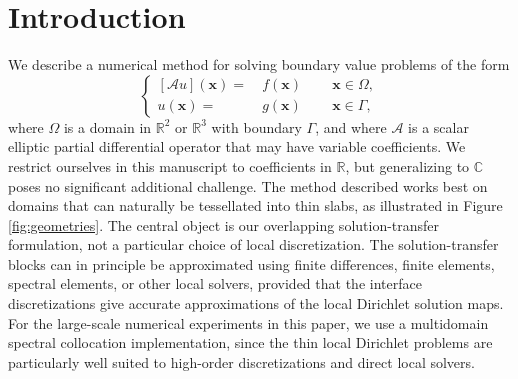 \documentclass[final,onefignum,onetabnum]{siamart250211}
\newcommand{\pvct}[1]{\bm{#1}}
\theoremstyle{definition}
\newcommand{\pgmnote}[1]{\textit{\color{blue}[#1]}}
\newcommand{\pxx}{\pvct{x}}
\begin{document}
\vspace{10mm}


\section{Introduction}
We describe a numerical method for solving boundary value problems of the form
\begin{equation}
\label{eq:basic}
\left\{\begin{aligned}\mbox{}
[\mathcal{A}u](\pxx) =&\ f(\pxx)\,\qquad \pxx \in \Omega,\\
   u(\pxx) =&\ g(\pxx)\,\qquad \pxx \in \Gamma,
\end{aligned}\right.
\end{equation}
where $\Omega$ is a domain in $\mathbb{R}^{2}$ or $\mathbb{R}^{3}$
with boundary $\Gamma$, and where $\mathcal{A}$ is a scalar elliptic
partial differential operator that may have variable coefficients. We restrict ourselves in this manuscript to coefficients in $\mathbb{R}$, but generalizing to $\mathbb{C}$ poses no significant additional challenge.
The method described works best on domains that can naturally be tessellated into thin slabs, as illustrated in Figure \ref{fig:geometries}. The central object is our overlapping solution-transfer formulation, not a particular choice of local discretization. The solution-transfer blocks can in principle be approximated using finite differences, finite elements, spectral elements, or other local solvers, provided that the interface discretizations give accurate approximations of the local Dirichlet solution maps. For the large-scale numerical experiments in this paper, we use a multidomain spectral collocation implementation, since the thin local Dirichlet problems are particularly well suited to high-order discretizations and direct local solvers.

\end{document}
